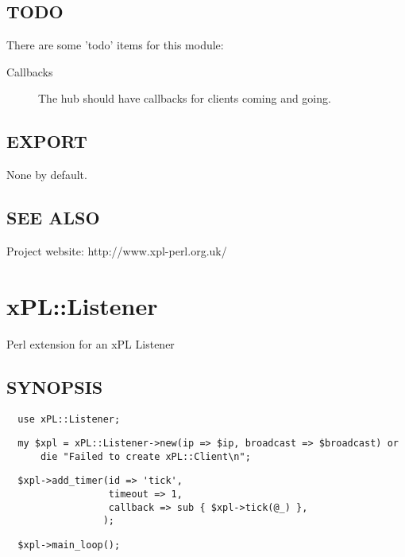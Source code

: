 \documentclass[12pt,a4paper]{article}
\begin{document}
\subsection*{TODO\label{xPL::Hub_TODO}}


There are some 'todo' items for this module:

\begin{description}

\item[{Callbacks}] \mbox{}

The hub should have callbacks for clients coming and going.

\end{description}
\subsection*{EXPORT\label{xPL::Hub_EXPORT}}


None by default.

\subsection*{SEE ALSO\label{xPL::Hub_SEE_ALSO}}


Project website: http://www.xpl-perl.org.uk/

\newpage
\section{xPL::Listener\label{xPL::Listener}}


Perl extension for an xPL Listener

\subsection*{SYNOPSIS\label{xPL::Listener_SYNOPSIS}}
\begin{verbatim}
  use xPL::Listener;
\end{verbatim}
\begin{verbatim}
  my $xpl = xPL::Listener->new(ip => $ip, broadcast => $broadcast) or
      die "Failed to create xPL::Client\n";
\end{verbatim}
\begin{verbatim}
  $xpl->add_timer(id => 'tick',
                  timeout => 1,
                  callback => sub { $xpl->tick(@_) },
                 );
\end{verbatim}
\begin{verbatim}
  $xpl->main_loop();
\end{verbatim}
\end{document}
